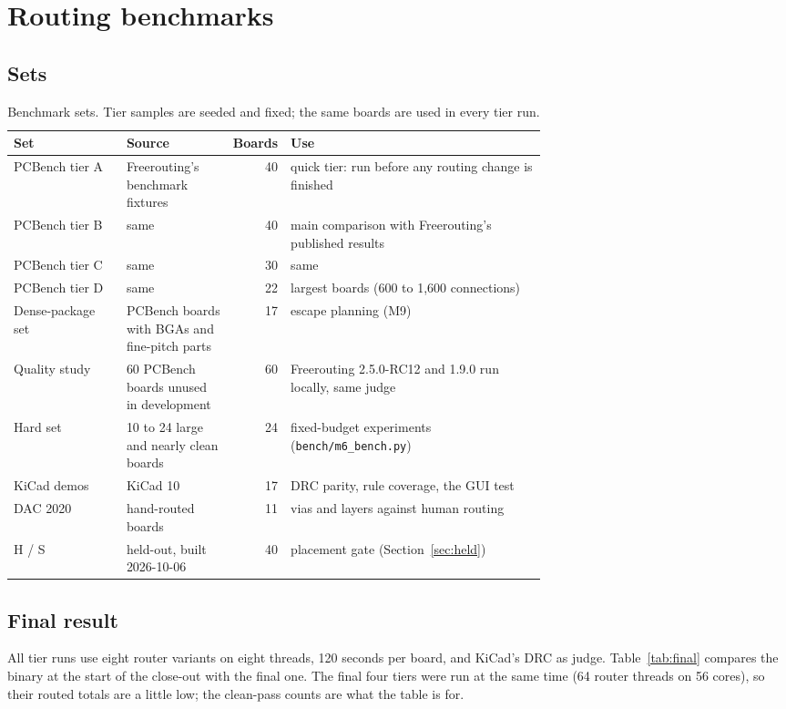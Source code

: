 \documentclass[10pt,a4paper]{article}
\newcommand{\code}[1]{\texttt{#1}}
\begin{document}
\section{Routing benchmarks}

\subsection{Sets}

\begin{table}[H]
\centering\small
\begin{tabular}{@{}lp{0.20\linewidth}rp{0.48\linewidth}@{}}
\toprule
Set & Source & Boards & Use \\
\midrule
PCBench tier A & Freerouting's benchmark fixtures & 40 & quick tier: run before any routing change is finished \\
PCBench tier B & same & 40 & main comparison with Freerouting's published results \\
PCBench tier C & same & 30 & same \\
PCBench tier D & same & 22 & largest boards (600 to 1,600 connections) \\
Dense-package set & PCBench boards with BGAs and fine-pitch parts & 17 & escape planning (M9) \\
Quality study & 60 PCBench boards unused in development & 60 & Freerouting 2.5.0-RC12 and 1.9.0 run locally, same judge \\
Hard set & 10 to 24 large and nearly clean boards & 24 & fixed-budget experiments (\code{bench/m6\_bench.py}) \\
KiCad demos & KiCad 10 & 17 & DRC parity, rule coverage, the GUI test \\
DAC 2020 & hand-routed boards & 11 & vias and layers against human routing \\
H / S & held-out, built 2026-10-06 & 40 & placement gate (Section~\ref{sec:held}) \\
\bottomrule
\end{tabular}
\caption{Benchmark sets. Tier samples are seeded and fixed; the same boards are used in every tier run.}
\end{table}

\subsection{Final result}

All tier runs use eight router variants on eight threads, 120 seconds per board, and KiCad's DRC as judge.
Table~\ref{tab:final} compares the binary at the start of the close-out with the final one. The final four
tiers were run at the same time (64 router threads on 56 cores), so their routed totals are a little low; the
clean-pass counts are what the table is for.
\end{document}
